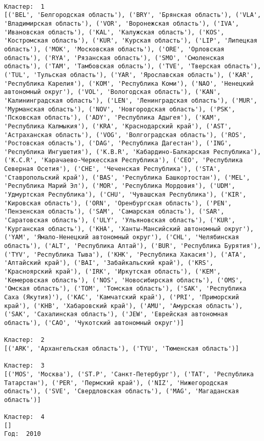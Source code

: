 \documentclass[11pt]{article}
\begin{document}
    \begin{Verbatim}[commandchars=\\\{\}]

Кластер:  1
[('BEL', 'Белгородская область'), ('BRY', 'Брянская область'), ('VLA', 'Владимирская область'), ('VOR', 'Воронежская область'), ('IVA', 'Ивановская область'), ('KAL', 'Калужская область'), ('KOS', 'Костромская область'), ('KUR', 'Курская область'), ('LIP', 'Липецкая область'), ('MOK', 'Московская область'), ('ORE', 'Орловская область'), ('RYA', 'Рязанская область'), ('SMO', 'Смоленская область'), ('TAM', 'Тамбовская область'), ('TVE', 'Тверская область'), ('TUL', 'Тульская область'), ('YAR', 'Ярославская область'), ('KAR', 'Республика Карелия'), ('KOM', 'Республика Коми'), ('NAO', 'Ненецкий автономный округ'), ('VOL', 'Вологодская область'), ('KAN', 'Калинингpадская область'), ('LEN', 'Ленинградская область'), ('MUR', 'Мурманская область'), ('NOV', 'Новгородская область'), ('PSK', 'Псковская область'), ('ADY', 'Республика Адыгея'), ('KAM', 'Республика Калмыкия'), ('KRA', 'Краснодарский край'), ('AST', 'Астраханская область'), ('VOG', 'Волгоградская область'), ('ROS', 'Ростовская область'), ('DAG', 'Республика Дагестан'), ('ING', 'Республика Ингушетия'), ('K.B.R', 'Кабардино-Балкарская Республика'), ('K.C.R', 'Карачаево-Черкесская Республика'), ('CEO', 'Республика Северная Осетия'), ('CHE', 'Чеченская Республика'), ('STA', 'Ставропольский край'), ('BAS', 'Республика Башкортостан'), ('MEL', 'Республика Марий Эл'), ('MOR', 'Республика Мордовия'), ('UDM', 'Удмуртская Республика'), ('CHU', 'Чувашская Республика'), ('KIR', 'Кировская область'), ('ORN', 'Оренбургская область'), ('PEN', 'Пензенская область'), ('SAM', 'Самарская область'), ('SAR', 'Саратовская область'), ('ULY', 'Ульяновская область'), ('KUR', 'Курганская область'), ('KHA', 'Ханты-Мансийский автономный округ'), ('YAM', 'Ямало-Ненецкий автономный округ'), ('CHL', 'Челябинская область'), ('ALT', 'Республика Алтай'), ('BUR', 'Республика Бурятия'), ('TYV', 'Республика Тыва'), ('KHK', 'Республика Хакасия'), ('ATA', 'Алтайский край'), ('BAI', 'Забайкальский край'), ('KRS', 'Красноярский край'), ('IRK', 'Иркутская область'), ('KEM', 'Кемеровская область'), ('NOS', 'Новосибирская область'), ('OMS', 'Омская область'), ('TOM', 'Томская область'), ('SAK', 'Республика Саха (Якутия)'), ('KAC', 'Камчатский край'), ('PRI', 'Приморский край'), ('KHB', 'Хабаровский край'), ('AMU', 'Амурская область'), ('SAK', 'Сахалинская область'), ('JEW', 'Еврейская автономная область'), ('CAO', 'Чукотский автономный округ')]

Кластер:  2
[('ARK', 'Архангельская область'), ('TYU', 'Тюменская область')]

Кластер:  3
[('MOS', 'Москва'), ('ST.P', 'Санкт-Петербург'), ('TAT', 'Республика Татарстан'), ('PER', 'Пермский край'), ('NIZ', 'Нижегородская область'), ('SVE', 'Свердловская область'), ('MAG', 'Магаданская область')]

Кластер:  4
[]
Год:  2010

    \end{Verbatim}
\end{document}
